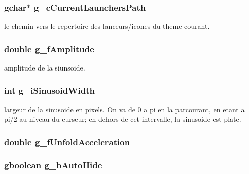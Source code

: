 \subsubsection{\setlength{\rightskip}{0pt plus 5cm}gchar$\ast$ {\bf g\_\-c\-Current\-Launchers\-Path}}\label{cairo-dock-icons_8c_540e05d87e90a39620d6d15e03dc808b}


le chemin vers le repertoire des lanceurs/icones du theme courant. 

\subsubsection{\setlength{\rightskip}{0pt plus 5cm}double {\bf g\_\-f\-Amplitude}}\label{cairo-dock-icons_8c_71125a40fdc7b421002f176b9b82ac79}


amplitude de la siunsoide. 

\subsubsection{\setlength{\rightskip}{0pt plus 5cm}int {\bf g\_\-i\-Sinusoid\-Width}}\label{cairo-dock-icons_8c_7ed10b4674d07794421af544ea9f2ad8}


largeur de la sinusoide en pixels. On va de 0 a pi en la parcourant, en etant a pi/2 au niveau du curseur; en dehors de cet intervalle, la sinusoide est plate. 

\subsubsection{\setlength{\rightskip}{0pt plus 5cm}double {\bf g\_\-f\-Unfold\-Acceleration}}\label{cairo-dock-icons_8c_321302a26af19930e4796a30e248a416}


\subsubsection{\setlength{\rightskip}{0pt plus 5cm}gboolean {\bf g\_\-b\-Auto\-Hide}}\label{cairo-dock-icons_8c_263de39492b5e16c81c98792f183edcf}


